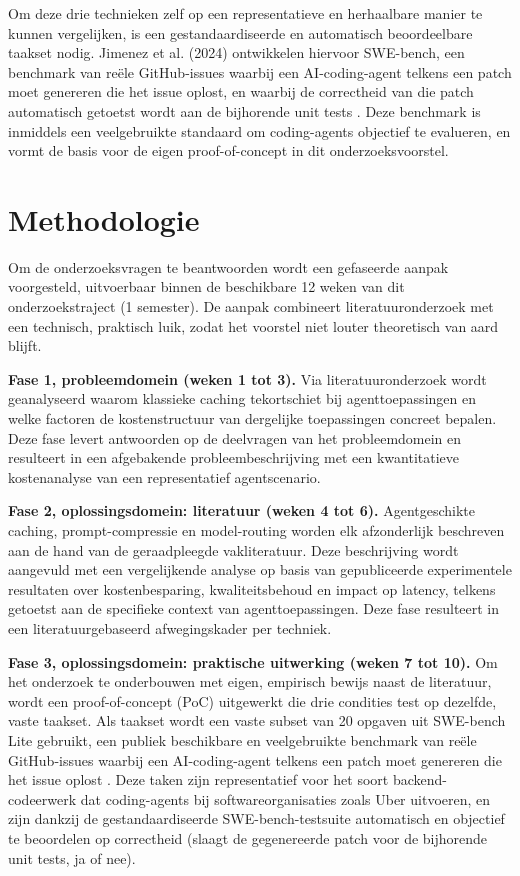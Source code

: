 \documentclass{hogent-article}
\begin{document}
Om deze drie technieken zelf op een representatieve en herhaalbare manier te kunnen vergelijken, is een gestandaardiseerde en automatisch beoordeelbare taakset nodig. Jimenez et al. (2024) ontwikkelen hiervoor SWE-bench, een benchmark van reële GitHub-issues waarbij een AI-coding-agent telkens een patch moet genereren die het issue oplost, en waarbij de correctheid van die patch automatisch getoetst wordt aan de bijhorende unit tests \autocite{Jimenez2024}. Deze benchmark is inmiddels een veelgebruikte standaard om coding-agents objectief te evalueren, en vormt de basis voor de eigen proof-of-concept in dit onderzoeksvoorstel.

\section{Methodologie}%
\label{sec:methodologie}

Om de onderzoeksvragen te beantwoorden wordt een gefaseerde aanpak voorgesteld, uitvoerbaar binnen de beschikbare 12 weken van dit onderzoekstraject (1 semester). De aanpak combineert literatuuronderzoek met een technisch, praktisch luik, zodat het voorstel niet louter theoretisch van aard blijft.

\textbf{Fase 1, probleemdomein (weken 1 tot 3).} Via literatuuronderzoek wordt geanalyseerd waarom klassieke caching tekortschiet bij agenttoepassingen en welke factoren de kostenstructuur van dergelijke toepassingen concreet bepalen. Deze fase levert antwoorden op de deelvragen van het probleemdomein en resulteert in een afgebakende probleembeschrijving met een kwantitatieve kostenanalyse van een representatief agentscenario.

\textbf{Fase 2, oplossingsdomein: literatuur (weken 4 tot 6).} Agentgeschikte caching, prompt-compressie en model-routing worden elk afzonderlijk beschreven aan de hand van de geraadpleegde vakliteratuur. Deze beschrijving wordt aangevuld met een vergelijkende analyse op basis van gepubliceerde experimentele resultaten over kostenbesparing, kwaliteitsbehoud en impact op latency, telkens getoetst aan de specifieke context van agenttoepassingen. Deze fase resulteert in een literatuurgebaseerd afwegingskader per techniek.

\textbf{Fase 3, oplossingsdomein: praktische uitwerking (weken 7 tot 10).} Om het onderzoek te onderbouwen met eigen, empirisch bewijs naast de literatuur, wordt een proof-of-concept (PoC) uitgewerkt die drie condities test op dezelfde, vaste taakset. Als taakset wordt een vaste subset van 20 opgaven uit SWE-bench Lite gebruikt, een publiek beschikbare en veelgebruikte benchmark van reële GitHub-issues waarbij een AI-coding-agent telkens een patch moet genereren die het issue oplost \autocite{Jimenez2024}. Deze taken zijn representatief voor het soort backend-codeerwerk dat coding-agents bij softwareorganisaties zoals Uber uitvoeren, en zijn dankzij de gestandaardiseerde SWE-bench-testsuite automatisch en objectief te beoordelen op correctheid (slaagt de gegenereerde patch voor de bijhorende unit tests, ja of nee).
\end{document}
